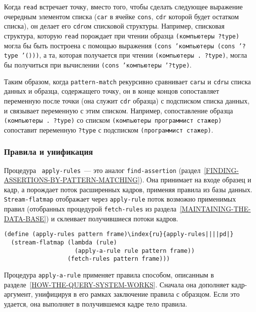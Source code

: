 Когда {\tt read}
встречает точку, вместо 
того, чтобы сделать следующее выражение очередным элементом списка
({\tt car} в ячейке {\tt cons}, {\tt cdr} которой
будет остатком списка), он делает его {\tt cdr}ом списковой
структуры. Например, списковая структура, которую {\tt read}
порождает при чтении образца {\tt (компьютеры ?type)} могла бы
быть построена с помощью выражения {\tt (cons 'компьютеры (cons '?type
'()))}, а та, которая получается при чтении {\tt (компьютеры
. ?type)}, могла бы получиться при вычислении {\tt (cons
'компьютеры '?type)}.

Таким образом, когда {\tt pattern-match}
рекурсивно сравнивает {\tt car}ы и {\tt cdr}ы списка
данных и образца, содержащего точку, он в конце концов сопоставляет
переменную после точки (она служит {\tt cdr} образца) с
подсписком списка данных, и связывает переменную с этим списком.
Например, сопоставление образца {\tt (компьютеры . ?type)} со
списком {\tt (компьютеры программист стажер)} сопоставит
переменную {\tt ?type} с подсписком {\tt (программист стажер)}.

\subsubsection{Правила и унификация}
\label{RULES-AND-UNIFICATION}%

Процедура {\tt 
apply-rules}~--- это аналог {\tt find-assertion} 
(раздел~\ref{FINDING-ASSERTIONS-BY-PATTERN-MATCHING}).  Она
принимает на входе образец и кадр, а порождает поток расширенных
кадров, применяя правила из базы данных. {\tt Stream-flatmap}
отображает через {\tt apply-rule} поток возможно применимых правил
(отобранных процедурой {\tt fetch-rules} из 
раздела~\ref{MAINTAINING-THE-DATA-BASE}) и склеивает получившиеся
потоки кадров.

\begin{Verbatim}[fontsize=\small]
(define (apply-rules pattern frame)\index{ru}{apply-rules||||pd|}
  (stream-flatmap (lambda (rule)
                    (apply-a-rule rule pattern frame))
                  (fetch-rules pattern frame)))
\end{Verbatim}

Процедура {\tt apply-a-rule} применяет правила
способом, описанным в разделе~\ref{HOW-THE-QUERY-SYSTEM-WORKS}.
Сначала она дополняет кадр-аргумент, унифицируя в его рамках
заключение правила с образцом. Если это удается, она выполняет в
получившемся кадре тело правила.

